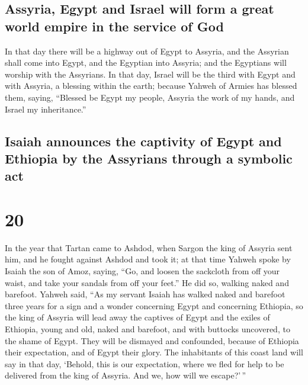 \hypertarget{assyria-egypt-and-israel-will-form-a-great-world-empire-in-the-service-of-god}{%
\subsection{Assyria, Egypt and Israel will form a great world empire in
the service of
God}\label{assyria-egypt-and-israel-will-form-a-great-world-empire-in-the-service-of-god}}

 In that day there will be a highway out of Egypt to
Assyria, and the Assyrian shall come into Egypt, and the Egyptian into
Assyria; and the Egyptians will worship with the Assyrians.
 In that day, Israel will be the third with Egypt and
with Assyria, a blessing within the earth;  because
Yahweh of Armies has blessed them, saying, ``Blessed be Egypt my people,
Assyria the work of my hands, and Israel my inheritance.''

\hypertarget{isaiah-announces-the-captivity-of-egypt-and-ethiopia-by-the-assyrians-through-a-symbolic-act}{%
\subsection{Isaiah announces the captivity of Egypt and Ethiopia by the
Assyrians through a symbolic
act}\label{isaiah-announces-the-captivity-of-egypt-and-ethiopia-by-the-assyrians-through-a-symbolic-act}}

\hypertarget{section-19}{%
\section{20}\label{section-19}}

 In the year that Tartan came to Ashdod, when Sargon the
king of Assyria sent him, and he fought against Ashdod and took it;
 at that time Yahweh spoke by Isaiah the son of Amoz,
saying, ``Go, and loosen the sackcloth from off your waist, and take
your sandals from off your feet.'' He did so, walking naked and
barefoot.  Yahweh said, ``As my servant Isaiah has walked
naked and barefoot three years for a sign and a wonder concerning Egypt
and concerning Ethiopia,  so the king of Assyria will lead
away the captives of Egypt and the exiles of Ethiopia, young and old,
naked and barefoot, and with buttocks uncovered, to the shame of Egypt.
 They will be dismayed and confounded, because of Ethiopia
their expectation, and of Egypt their glory.  The
inhabitants of this coast land will say in that day, `Behold, this is
our expectation, where we fled for help to be delivered from the king of
Assyria. And we, how will we escape?'\,''

